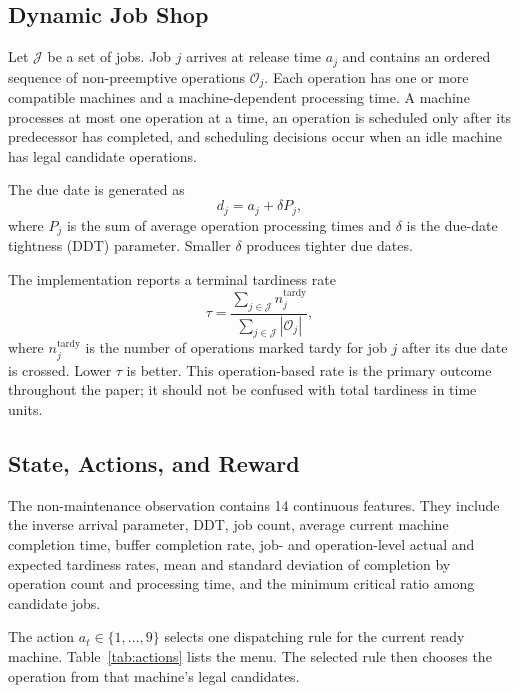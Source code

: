 \documentclass[conference]{IEEEtran}
\begin{document}
\subsection{Dynamic Job Shop}

Let $\mathcal{J}$ be a set of jobs. Job $j$ arrives at release time $a_j$ and contains an ordered sequence of non-preemptive operations $\mathcal{O}_j$. Each operation has one or more compatible machines and a machine-dependent processing time. A machine processes at most one operation at a time, an operation is scheduled only after its predecessor has completed, and scheduling decisions occur when an idle machine has legal candidate operations.

The due date is generated as
\begin{equation}
    d_j = a_j + \delta P_j,
\end{equation}
where $P_j$ is the sum of average operation processing times and $\delta$ is the due-date tightness (DDT) parameter. Smaller $\delta$ produces tighter due dates.

The implementation reports a terminal tardiness rate
\begin{equation}
    \tau = \frac{\sum_{j \in \mathcal{J}} n^{\mathrm{tardy}}_j}
    {\sum_{j \in \mathcal{J}} |\mathcal{O}_j|},
\end{equation}
where $n^{\mathrm{tardy}}_j$ is the number of operations marked tardy for job $j$ after its due date is crossed. Lower $\tau$ is better. This operation-based rate is the primary outcome throughout the paper; it should not be confused with total tardiness in time units.

\subsection{State, Actions, and Reward}

The non-maintenance observation contains 14 continuous features. They include the inverse arrival parameter, DDT, job count, average current machine completion time, buffer completion rate, job- and operation-level actual and expected tardiness rates, mean and standard deviation of completion by operation count and processing time, and the minimum critical ratio among candidate jobs.

The action $a_t \in \{1,\ldots,9\}$ selects one dispatching rule for the current ready machine. Table~\ref{tab:actions} lists the menu. The selected rule then chooses the operation from that machine's legal candidates.
\end{document}
